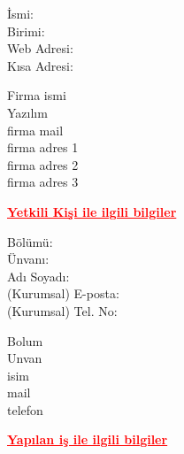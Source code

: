 \documentclass[12pt]{article}
\begin{document}
\begin{minipage}[t]{.3\textwidth}
  \begin{flushright}
      İsmi: \\
      Birimi: \\
      Web Adresi: \\
      Kısa Adresi:
  \end{flushright}
\end{minipage}%
\hspace{0.5cm}
\begin{minipage}[t]{.7\textwidth}
  Firma ismi \\
  Yazılım \\
  firma mail \\
  firma adres 1 \\
  firma adres 2 \\
  firma adres 3
\end{minipage}

\newpage
    {\centering
  \textcolor{red}{\bfseries \ul{Yetkili Kişi ile ilgili bilgiler}}
  \\[1\baselineskip]
  \par}

\begin{minipage}[t]{.3\textwidth}
  \begin{flushright}
      Bölümü: \\
      Ünvanı: \\
      Adı Soyadı: \\
      (Kurumsal) E-posta: \\
      (Kurumsal) Tel. No:
  \end{flushright}
\end{minipage}%
\hspace{0.5cm}
\begin{minipage}[t]{.7\textwidth}
  Bolum \\
  Unvan \\
  isim \\
  mail \\
  telefon \\[2\baselineskip]
\end{minipage}

{\centering
  \textcolor{red}{\bfseries \ul{Yapılan i\c{s} ile ilgili bilgiler}}
  \\[1\baselineskip]
  \par}
\end{document}
